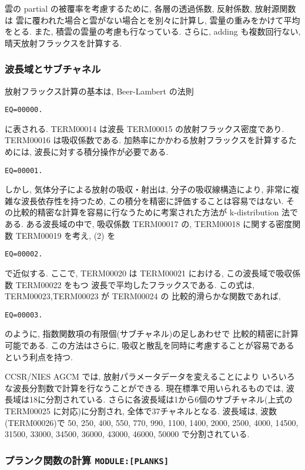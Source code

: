 雲の partial の被覆率を考慮するために,
各層の透過係数, 反射係数, 放射源関数は
雲に覆われた場合と雲がない場合とを別々に計算し,
雲量の重みをかけて平均をとる.
また, 積雲の雲量の考慮も行なっている.
さらに, adding も複数回行ない, 晴天放射フラックスを計算する.

\subsubsection{波長域とサブチャネル}

放射フラックス計算の基本は,
Beer-Lambert の法則
\begin{verbatim}
EQ=00000.
\end{verbatim}
に表される. TERM00014 は波長 TERM00015 の放射フラックス密度であり.
TERM00016 は吸収係数である.
加熱率にかかわる放射フラックスを計算するためには,
波長に対する積分操作が必要である.
%
\begin{verbatim}
EQ=00001.
\end{verbatim}
%
しかし, 気体分子による放射の吸収・射出は,
分子の吸収線構造により, 非常に複雑な波長依存性を持つため,
この積分を精密に評価することは容易ではない.
その比較的精密な計算を容易に行なうために考案された方法が
k-distribution 法である.
ある波長域の中で, 吸収係数 TERM00017 の,
TERM00018 に関する密度関数 TERM00019 を考え,
(2) を
\begin{verbatim}
EQ=00002.
\end{verbatim}
で近似する. ここで, TERM00020 は
TERM00021 における, この波長域で吸収係数 TERM00022 をもつ
波長で平均したフラックスである.
この式は, TERM00023,TERM00023 が TERM00024 の
比較的滑らかな関数であれば, 
\begin{verbatim}
EQ=00003.
\end{verbatim}
のように, 指数関数項の有限個(サブチャネル)の足しあわせで
比較的精密に計算可能である.
この方法はさらに,
吸収と散乱を同時に考慮することが容易であるという利点を持つ.

CCSR/NIES AGCM では,
放射パラメータデータを変えることにより
いろいろな波長分割数で計算を行なうことができる.
現在標準で用いられるものでは,
波長域は18に分割されている.
さらに各波長域は1から6個のサブチャネル(上式の TERM00025 に対応)に分割され,
全体で37チャネルとなる.
波長域は, 波数(TERM00026)で
50, 250, 400, 550, 770, 990, 1100, 1400, 2000,
2500, 4000, 14500, 31500, 33000, 34500, 36000, 43000, 46000, 50000
で分割されている.

\subsubsection{プランク関数の計算 \texttt{MODULE:[PLANKS]}}

